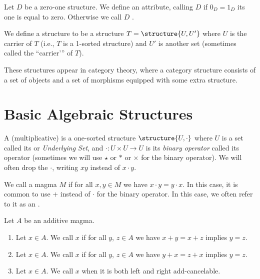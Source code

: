 \begin{definition}
Let $D$ be a zero-one structure. We define an attribute, calling
$D$  if $0_{D}=1_{D}$ its one is equal to
zero. Otherwise we call $D$ .
\end{definition}

\begin{definition}
We define a  structure to be a structure
$T=\structure{U,U'}$ where $U$ is the carrier of $T$ (i.e., $T$ is a
1-sorted structure) and $U'$ is another set (sometimes called the
``carrier'\thinspace'' of $T$).

These structures appear in category theory, where a category structure consists
of a set of objects and a set of morphisms equipped with some extra
structure. 
\end{definition}

\section{Basic Algebraic Structures}

\begin{definition}[Magmas]
A (multiplicative)  is a one-sorted structure
$\structure{U, \cdot}$ where $U$ is a set called its 
or \emph{Underlying Set}, and $\cdot\colon U\times U\to U$ is its
\emph{binary operator} called its  operator
(sometimes we will use $\star$ or $*$ or $\times$ for the binary
operator). We will often drop the $\cdot$, writing $xy$ instead of
$x\cdot y$.

We call a magma $M$  if for all $x,y\in M$ we have
$x\cdot y=y\cdot x$. In this case, it is common to use $+$ instead of
$\cdot$ for the binary operator. In this case, we often refer to it as
an .
\end{definition}

\begin{definition}
Let $A$ be an additive magma.
\begin{enumerate}
\item{} Let $x\in A$. We call $x$ 
  if for all $y$, $z\in A$ we have $x+y=x+z$ implies $y=z$.
\item{} Let $x\in A$. We call $x$ 
  if for all $y$, $z\in A$ we have $y+x=z+x$ implies $y=z$.
\item{} Let $x\in A$. We call $x$ 
  when it is both left and right add-cancelable.
\end{enumerate}
\end{definition}

